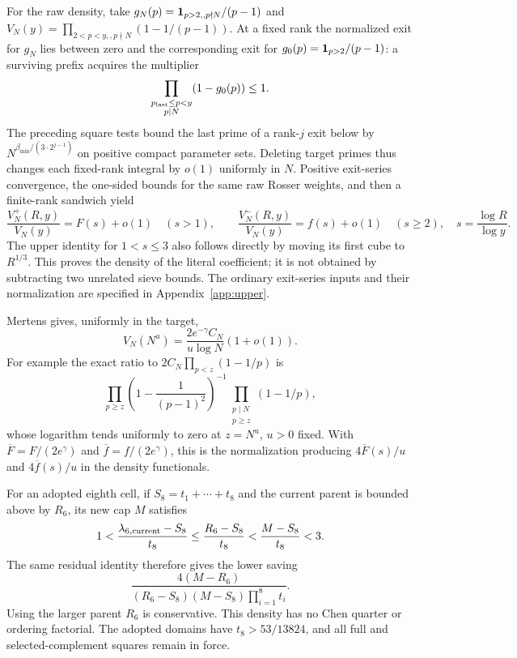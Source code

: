 For the raw density, take
$g_N(p)={\bf1}_{p>2,,p\nmid N}/(p-1)$ and
$V_N(y)=\prod_{2<p<y,,p\nmid N}(1-1/(p-1))$.
At a fixed rank the normalized exit for $g_N$ lies between zero and
the corresponding exit for $g_0(p)={\bf1}_{p>2}/(p-1)$: a surviving
prefix acquires the multiplier
\[
 \prod_{\substack{p_{\rm last}\le p<y\\p\mid N}}(1-g_0(p))\le1.
\]
The preceding square tests bound the last prime of a rank-$j$ exit
below by $N^{\beta_{\min}/(3\cdot2^{j-1})}$ on positive compact
parameter sets.  Deleting target primes thus changes each fixed-rank
integral by $o(1)$ uniformly in $N$.  Positive exit-series convergence,
the one-sided bounds for the same raw Rosser weights, and then a
finite-rank sandwich yield
\begin{equation}
 \frac{V_N^+(R,y)}{V_N(y)}=F(s)+o(1)\quad(s>1),\qquad
 \frac{V_N^-(R,y)}{V_N(y)}=f(s)+o(1)\quad(s\ge2),
 \quad s=\frac{\log R}{\log y}.
 \label{eq:current-raw-density}
\end{equation}
The upper identity for $1<s\le3$ also follows directly by moving its
first cube to $R^{1/3}$.  This proves the density of the literal
coefficient; it is not obtained by subtracting two unrelated sieve
bounds.  The ordinary exit-series inputs and their normalization are
specified in Appendix~\ref{app:upper}.

Mertens gives, uniformly in the target,
\begin{equation}
 V_N(N^u)=\frac{2e^{-\gamma}C_N}{u\log N}(1+o(1)).
 \label{eq:current-mertens}
\end{equation}
For example the exact ratio to $2C_N\prod_{p<z}(1-1/p)$ is
\[
 \prod_{p\ge z}\left(1-\frac1{(p-1)^2}\right)^{-1}
 \prod_{\substack{p\mid N\\p\ge z}}(1-1/p),
\]
whose logarithm tends uniformly to zero at $z=N^u$, $u>0$ fixed.
With $\overline F=F/(2e^\gamma)$ and
$\overline f=f/(2e^\gamma)$, this is the normalization producing
$4\overline F(s)/u$ and $4\overline f(s)/u$ in the density functionals.

For an adopted eighth cell, if $S_8=t_1+\cdots+t_8$ and the current
parent is bounded above by $R_6$, its new cap $M$ satisfies
\[
 1<\frac{\lambda_{6,\rm current}-S_8}{t_8}
  \le\frac{R_6-S_8}{t_8}<\frac{M-S_8}{t_8}<3.
\]
The same residual identity therefore gives the lower saving
\begin{equation}
 \frac{4(M-R_6)}{(R_6-S_8)(M-S_8)\prod_{i=1}^8t_i}.
 \label{eq:current-eighth-saving}
\end{equation}
Using the larger parent $R_6$ is conservative.  This density has no
Chen quarter or ordering factorial.  The adopted domains have
$t_8>53/13824$, and all full and selected-complement squares remain
in force.


